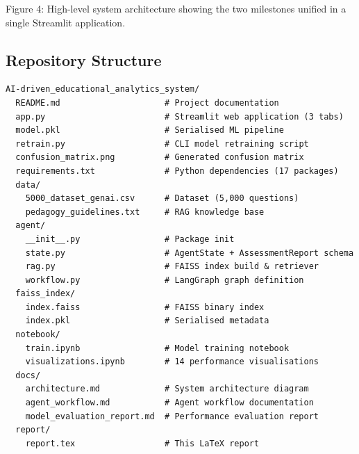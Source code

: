 \documentclass[12pt, a4paper, twoside]{article}
\begin{document}
\begin{center}
\end{center}

\begin{center}
\footnotesize\textcolor{muted}{Figure 4: High-level system architecture
showing the two milestones unified in a single Streamlit application.}
\end{center}

\subsection{Repository Structure}

\begin{lstlisting}[language={}, basicstyle=\ttfamily\footnotesize,
  frame=none, backgroundcolor=\color{codebg},
  caption={Complete repository layout.}]
AI-driven_educational_analytics_system/
  README.md                     # Project documentation
  app.py                        # Streamlit web application (3 tabs)
  model.pkl                     # Serialised ML pipeline
  retrain.py                    # CLI model retraining script
  confusion_matrix.png          # Generated confusion matrix
  requirements.txt              # Python dependencies (17 packages)
  data/
    5000_dataset_genai.csv      # Dataset (5,000 questions)
    pedagogy_guidelines.txt     # RAG knowledge base
  agent/
    __init__.py                 # Package init
    state.py                    # AgentState + AssessmentReport schema
    rag.py                      # FAISS index build & retriever
    workflow.py                 # LangGraph graph definition
  faiss_index/
    index.faiss                 # FAISS binary index
    index.pkl                   # Serialised metadata
  notebook/
    train.ipynb                 # Model training notebook
    visualizations.ipynb        # 14 performance visualisations
  docs/
    architecture.md             # System architecture diagram
    agent_workflow.md           # Agent workflow documentation
    model_evaluation_report.md  # Performance evaluation report
  report/
    report.tex                  # This LaTeX report
\end{lstlisting}
\end{document}
